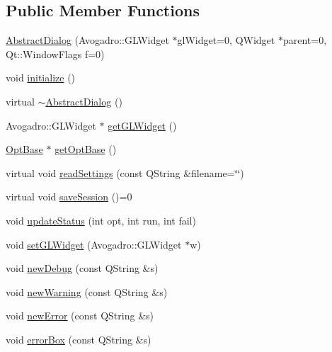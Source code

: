 \subsection*{Public Member Functions}
\begin{DoxyCompactItemize}
\item 
\hyperlink{classGlobalSearch_1_1AbstractDialog_a44af0af55038d330e284d3ddc567dd3f}{Abstract\+Dialog} (Avogadro\+::\+G\+L\+Widget $\ast$gl\+Widget=0, Q\+Widget $\ast$parent=0, Qt\+::\+Window\+Flags f=0)
\item 
void \hyperlink{classGlobalSearch_1_1AbstractDialog_aea19edd77198f2e6155002f53a61add6}{initialize} ()
\item 
virtual \hyperlink{classGlobalSearch_1_1AbstractDialog_a55ebf148332cc0eca585e816bda871ae}{$\sim$\+Abstract\+Dialog} ()
\item 
Avogadro\+::\+G\+L\+Widget $\ast$ \hyperlink{classGlobalSearch_1_1AbstractDialog_a4823851b13319cd2a4384c00346faf22}{get\+G\+L\+Widget} ()
\item 
\hyperlink{classGlobalSearch_1_1OptBase}{Opt\+Base} $\ast$ \hyperlink{classGlobalSearch_1_1AbstractDialog_ad2fe5c3c110152b29207b54df72dbd45}{get\+Opt\+Base} ()
\item 
virtual void \hyperlink{classGlobalSearch_1_1AbstractDialog_aa798b5d3d1099bce37207a3f15b0eb6a}{read\+Settings} (const Q\+String \&filename=\char`\"{}\char`\"{})
\item 
virtual void \hyperlink{classGlobalSearch_1_1AbstractDialog_a6e9ef21da0b2e60513a11f7de55ffbd7}{save\+Session} ()=0
\item 
void \hyperlink{classGlobalSearch_1_1AbstractDialog_a40bbc9eb104fe418e1fb2ba93bd2a2ae}{update\+Status} (int opt, int run, int fail)
\item 
void \hyperlink{classGlobalSearch_1_1AbstractDialog_a861a8ddbb5ca235f5966737755911aa3}{set\+G\+L\+Widget} (Avogadro\+::\+G\+L\+Widget $\ast$w)
\item 
void \hyperlink{classGlobalSearch_1_1AbstractDialog_a7353bd5b3393faf017287674691e56c6}{new\+Debug} (const Q\+String \&s)
\item 
void \hyperlink{classGlobalSearch_1_1AbstractDialog_abe3084783126e2d1f09c9250c11f8f39}{new\+Warning} (const Q\+String \&s)
\item 
void \hyperlink{classGlobalSearch_1_1AbstractDialog_ae0b664aa133ded37df0dc5f7a040f0c5}{new\+Error} (const Q\+String \&s)
\item 
void \hyperlink{classGlobalSearch_1_1AbstractDialog_aee94863a2a275b8a91613b191451bc1e}{error\+Box} (const Q\+String \&s)
\end{DoxyCompactItemize}
